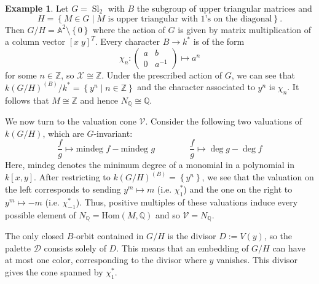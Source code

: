 \documentclass[12pt,twoside,cd]{amsart}
\theoremstyle{definition}
\newtheorem{example}[theorem]{Example}
\begin{document}
\begin{example}\label{EX}
Let $G = {\operatorname{Sl}}_2$ with $B$ the subgroup of upper triangular matrices and
\[
H = {\left\lbrace {M \in G \mid M \text{ is upper triangular with 1's on the diagonal}} \right\rbrace}.
\]
Then $G/H = \mathbb{A}^2 \setminus {\left\lbrace {0} \right\rbrace}$ where the action of $G$ is given by matrix multiplication of a column vector $[x \; y]^T$.
Every character $B \rightarrow k^\ast$ is of the form
\[
\chi_n: \left( \begin{array}{cc}
a & b \\
0 & a^{-1}
\end{array} \right)
\mapsto a^n
\]
for some $n \in \mathbb{Z}$, so $\mathcal{X} \cong \mathbb{Z}$.
Under the prescribed action of $G$, we can see that $k(G/H)^{(B)}/k^* = {\left\lbrace {y^n \mid n \in \mathbb{Z}} \right\rbrace}$ and the character associated to $y^n$ is $\chi_n$.
It follows that $M \cong \mathbb{Z}$ and hence $N_\mathbb{Q} \cong \mathbb{Q}$.

We now turn to the valuation cone $\mathcal{V}$.
Consider the following two valuations of $k(G/H)$, which are $G$-invariant:
\[
\frac{f}{g} \mapsto {{\text{mindeg } {f}}} - {{\text{mindeg } {g}}} \qquad \qquad \frac{f}{g} \mapsto \deg{g} - \deg{f}
\]
Here, mindeg denotes the minimum degree of a monomial in a polynomial in $k[x,y]$.
After restricting to $k(G/H)^{(B)} = {\left\lbrace {y^n} \right\rbrace}$, we see that the valuation on the left corresponds to sending $y^m \mapsto m$ (i.e. $\chi_1^\ast$)  
and the one on the right to $y^m \mapsto -m$ (i.e. $\chi_{-1}^\ast$).
Thus, positive multiples of these valuations induce every possible element of $N_\mathbb{Q} = \text{Hom}(M, \mathbb{Q})$ and so $\mathcal{V} = N_\mathbb{Q}$.

The only closed $B$-orbit contained in $G/H$ is the divisor $D := V(y)$, so the palette $\mathcal{D}$ consists solely of $D$.
This means that an embedding of $G/H$ can have at most one color, corresponding to the divisor where $y$ vanishes.
This divisor gives the cone spanned by $\chi_1^\ast$.


\end{example}
\end{document}

